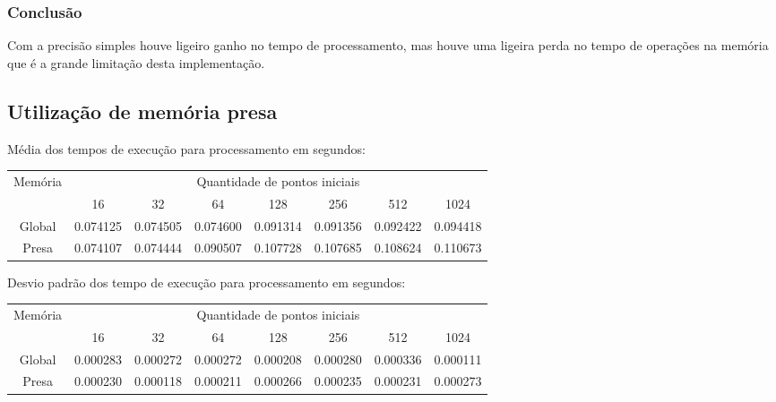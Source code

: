     \subsubsection{Conclusão}
    Com a precisão simples houve ligeiro ganho no tempo de processamento, mas houve uma ligeira perda no tempo de operações na memória que é a grande limitação desta implementação.
  
  \subsection{Utilização de memória presa}
  \begin{small}
  Média dos tempos de execução para processamento em segundos:\\
  \begin{tabular}{| c | c | c | c | c | c | c | c |}
    \hline
    \multirow{2}{*}{Memória}& \multicolumn{7}{|c|}{Quantidade de pontos iniciais} \\ \cline{2-8}
    & 16 & 32 & 64 & 128 & 256 & 512 & 1024 \\ \hline
    Global & 0.074125 & 0.074505 & 0.074600 & 0.091314 & 0.091356 & 0.092422 & 0.094418\\ \hline
    Presa & 0.074107 & 0.074444 & 0.090507 & 0.107728 & 0.107685 & 0.108624 & 0.110673\\ \hline

    \hline
  \end{tabular}
  \end{small}  
  \hspace{1mm}\newline
  
  \newpage
  \begin{small}
  \noindent Desvio padrão dos tempo de execução para processamento em segundos:\\
  \begin{tabular}{| c | c | c | c | c | c | c | c |}
    \hline
    \multirow{2}{*}{Memória}& \multicolumn{7}{|c|}{Quantidade de pontos iniciais} \\ \cline{2-8}
    & 16 & 32 & 64 & 128 & 256 & 512 & 1024\\ \hline
    Global & 0.000283 & 0.000272 & 0.000272 & 0.000208 & 0.000280 & 0.000336 & 0.000111\\ \hline
    Presa & 0.000230 & 0.000118 & 0.000211 & 0.000266 & 0.000235 & 0.000231 & 0.000273\\ \hline

    \hline
  \end{tabular}
  \end{small}
  
